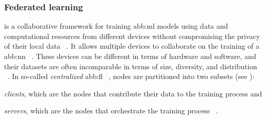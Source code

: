 \subsubsection{Federated learning}\label{ssub:background:fl}


 is a collaborative framework for training \gls{abb:ml} models
using data and computational resources from different devices
without compromising the privacy of their local data%
~\cite{wangEdgeAIConvergence2020,xiaSurveyFederatedLearning2021}.
It allows multiple devices to collaborate on the training of a \gls{abb:nn}%
~\cite{mcmahanCommunicationEfficientLearningDeep2017}.
These devices can be different in terms of hardware and software,
and their datasets are often incomparable in terms of size, diversity, and distribution%
~\cite{xiaSurveyFederatedLearning2021}.
In so-called \emph{centralized} \gls{abb:fl}%
~\cite{naikIntroductionFederatedLearning2024},
nodes are partitioned into two subsets (see ):
\begin{enumerate*}[label=(\roman*)]
  \item \emph{clients}, which are the nodes that contribute their data to the training process and
  \item \emph{servers}, which are the nodes that orchestrate the training process%
        ~\cite{xiaSurveyFederatedLearning2021}.
\end{enumerate*}

